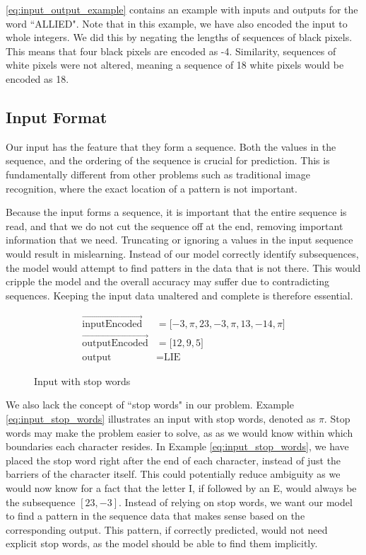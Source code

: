 \ref{eq:input_output_example} contains an example with inputs and outputs for the word ``ALLIED". Note that in this example, we have also encoded the input to whole integers. We did this by negating the lengths of sequences of black pixels. This means that four black pixels are encoded as -4. Similarity, sequences of white pixels were not altered, meaning a sequence of 18 white pixels would be encoded as 18.

\subsection{Input Format}
Our input has the feature that they form a sequence. Both the values in the sequence, and the ordering of the sequence is crucial for prediction. This is fundamentally different from other problems such as traditional image recognition, where the exact location of a pattern is not important.

Because the input forms a sequence, it is important that the entire sequence is read, and that we do not cut the sequence off at the end, removing important information that we need. Truncating or ignoring a values in the input sequence would result in mislearning. Instead of our model correctly identify subsequences, the model would attempt to find patters in the data that is not there. This would cripple the model and the overall accuracy may suffer due to contradicting sequences. Keeping the input data unaltered and complete is therefore essential.

\begin{figure}[h]
    \begin{equation}
        \label{eq:input_stop_words}
        \begin{aligned}
           \vec{\text{inputEncoded}}                &= \lbrack -3, \pi, 23, -3, \pi, 13, -14, \pi \rbrack \\
           \vec{\text{outputEncoded}}               &= \lbrack 12, 9, 5 \rbrack \\
           \text{output}                            &= \text{LIE}
        \end{aligned}
    \end{equation}
    \captionsetup{labelformat=empty}
    \caption{Input with stop words}
\end{figure}

We also lack the concept of ``stop words" in our problem. Example \ref{eq:input_stop_words} illustrates an input with stop words, denoted as $\pi$. Stop words may make the problem easier to solve, as as we would know within which boundaries each character resides. In Example \ref{eq:input_stop_words}, we have placed the stop word right after the end of each character, instead of just the barriers of the character itself. This could potentially reduce ambiguity as we would now know for a fact that the letter I, if followed by an E, would always be the subsequence \([23, -3]\). Instead of relying on stop words, we want our model to find a pattern in the sequence data that makes sense based on the corresponding output. This pattern, if correctly predicted, would not need explicit stop words, as the model should be able to find them implicitly.


